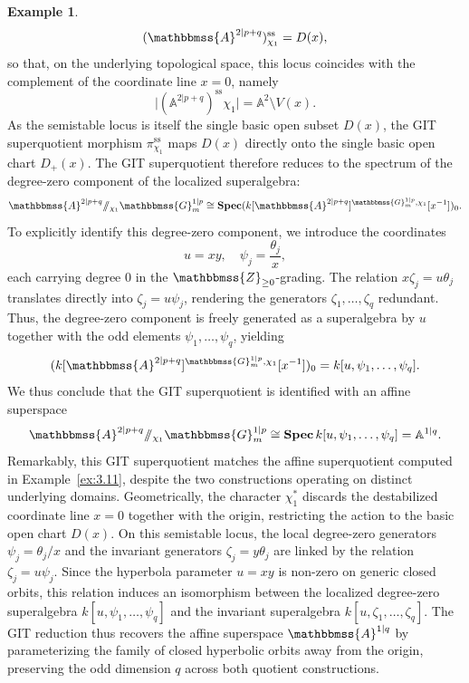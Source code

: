 \documentclass[11pt,a4paper,reqno,noamsfonts]{amsart}
\numberwithin{equation}{section}
\theoremstyle{definition}
\newtheorem{example}[theorem]{Example}
\theoremstyle{remark}
\renewcommand{\AA}{\ensuremath{\mathbbmss{A}}}
\newcommand{\GG}{\ensuremath{\mathbbmss{G}}}
\newcommand{\ZZ}{\ensuremath{\mathbbmss{Z}}}
\newcommand{\uss}{\ensuremath{\mathrm{ss}}}
\DeclareMathOperator{\sSpec}{\mathbf{Spec}}
\begin{document}
\begin{example}
$$
(\AA^{2 \vert p+q})^{\uss}_{\chi_1} = D(x),
$$
so that, on the underlying topological space, this locus coincides with the complement of the coordinate line $x=0$, namely 
$$
\lvert (\mathbb{A}^{2 \vert p+q})^{\mathrm{ss}}{\chi_1} \rvert = \mathbb{A}^2 \setminus V(x).
$$
As the semistable locus is itself the single basic open subset $D(x)$, the GIT superquotient morphism $\pi^{\uss}_{\chi_1}$ maps $D(x)$ directly onto the single basic open chart $D_+(x)$. The GIT superquotient therefore reduces to the spectrum of the degree-zero component of the localized superalgebra:
$$
\AA^{2 \vert p+q} {\sslash_{\chi_1}} \GG_m^{1 \vert p} \cong \sSpec ( k[\AA^{2 \vert p+q}]^{\GG_m^{1 \vert p}, \chi_1}[x^{-1}] )_0.
$$
To explicitly identify this degree-zero component, we introduce the coordinates
$$
u = xy, \quad \psi_j = \frac{\theta_j}{x},
$$
each carrying degree $0$ in the $\ZZ_{\geq 0}$-grading. The relation $x \zeta_j = u \theta_j$ translates directly into $\zeta_j = u \psi_j$, rendering the generators $\zeta_1, \dots, \zeta_q$ redundant. Thus, the degree-zero component is freely generated as a superalgebra by $u$ together with the odd elements $\psi_1, \dots, \psi_q$, yielding
$$
( k[\AA^{2 \vert p+q}]^{\GG_m^{1 \vert p}, \chi_1}[x^{-1}] )_0 = k[u,\psi_1,\dots,\psi_q].
$$
We thus conclude that the GIT superquotient is identified with an affine superspace
$$
\AA^{2 \vert p+q} {\sslash_{\chi_1}} \GG_m^{1 \vert p} \cong \sSpec k[u, \psi_1, \dots, \psi_q] = \mathbb{A}^{1 \vert q}.
$$
Remarkably, this GIT superquotient matches the affine superquotient computed in Example~\ref{ex:3.11}, despite the two constructions operating on distinct underlying domains. Geometrically, the character $\chi_1^*$ discards the destabilized coordinate line $x = 0$ together with the origin, restricting the action to the basic open chart $D(x)$. On this semistable locus, the local degree-zero generators $\psi_j = \theta_j / x$ and the invariant generators $\zeta_j = y \theta_j$ are linked by the relation $\zeta_j = u \psi_j$. Since the hyperbola parameter $u = xy$ is non-zero on generic closed orbits, this relation induces an isomorphism between the localized degree-zero superalgebra $k[u, \psi_1, \dots, \psi_q]$ and the invariant superalgebra $k[u, \zeta_1, \dots, \zeta_q]$. The GIT reduction thus recovers the affine superspace $\AA^{1 \vert q}$ by parameterizing the family of closed hyperbolic orbits away from the origin, preserving the odd dimension $q$ across both quotient constructions. 
\end{example}
\end{document}
